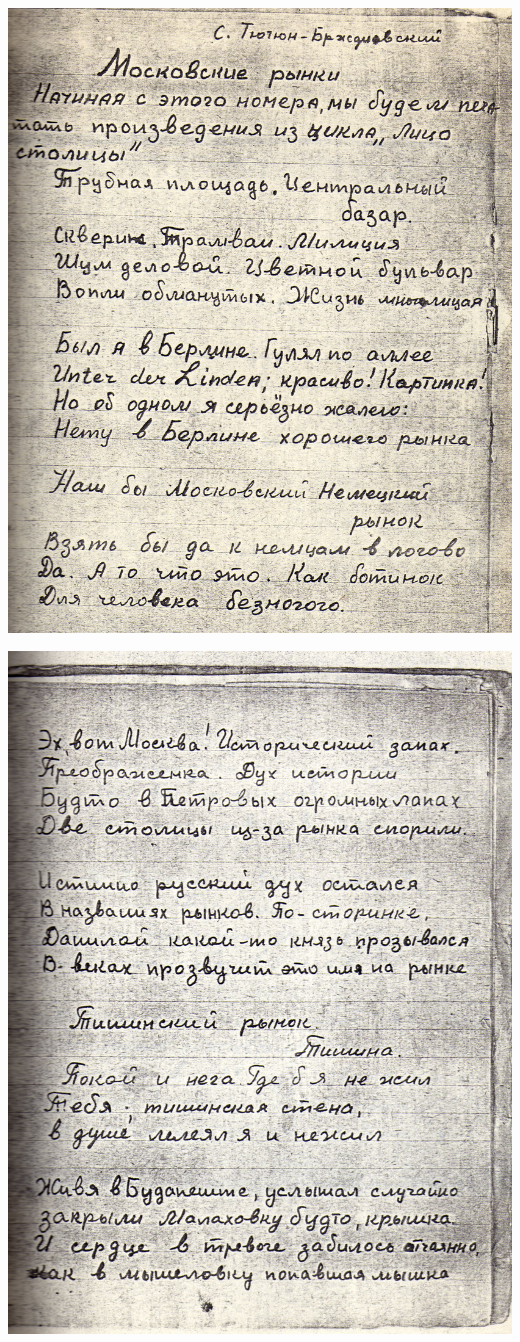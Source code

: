 \newpage

\noindent
\includegraphics[width=\textwidth]{inc/Vynd/Vynd009}

\noindent
\includegraphics[width=\textwidth]{inc/Vynd/Vynd010}

